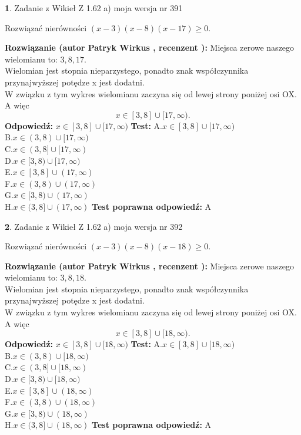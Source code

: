 \documentclass[12pt, a4paper]{article}
\theoremstyle{definition} %
\newtheorem{zad}{}
\newcommand{\zadStart}[1]{\begin{zad}#1\newline}
\newcommand{\zadStop}{\end{zad}}
\newcommand{\rozwStart}[2]{\noindent \textbf{Rozwiązanie (autor #1 , recenzent #2): }\newline}
\newcommand{\rozwStop}{\newline}
\newcommand{\odpStart}{\noindent \textbf{Odpowiedź:}\newline}
\newcommand{\odpStop}{\newline}
\newcommand{\testStart}{\noindent \textbf{Test:}\newline}
\newcommand{\testStop}{\newline}
\newcommand{\kluczStart}{\noindent \textbf{Test poprawna odpowiedź:}\newline}
\newcommand{\kluczStop}{\newline}
\begin{document}
\zadStart{Zadanie z Wikieł Z 1.62 a) moja wersja nr 391}

Rozwiązać nierówności $(x-3)(x-8)(x-17)\ge0$.
\zadStop
\rozwStart{Patryk Wirkus}{}
Miejsca zerowe naszego wielomianu to: $3, 8, 17$.\\
Wielomian jest stopnia nieparzystego, ponadto znak współczynnika przy\linebreak najwyższej potędze x jest dodatni.\\ W związku z tym wykres wielomianu zaczyna się od lewej strony poniżej osi OX. A więc $$x \in [3,8] \cup [17,\infty).$$
\rozwStop
\odpStart
$x \in [3,8] \cup [17,\infty)$
\odpStop
\testStart
A.$x \in [3,8] \cup [17,\infty)$\\
B.$x \in (3,8) \cup [17,\infty)$\\
C.$x \in (3,8] \cup [17,\infty)$\\
D.$x \in [3,8) \cup [17,\infty)$\\
E.$x \in [3,8] \cup (17,\infty)$\\
F.$x \in (3,8) \cup (17,\infty)$\\
G.$x \in [3,8) \cup (17,\infty)$\\
H.$x \in (3,8] \cup (17,\infty)$
\testStop
\kluczStart
A
\kluczStop



\zadStart{Zadanie z Wikieł Z 1.62 a) moja wersja nr 392}

Rozwiązać nierówności $(x-3)(x-8)(x-18)\ge0$.
\zadStop
\rozwStart{Patryk Wirkus}{}
Miejsca zerowe naszego wielomianu to: $3, 8, 18$.\\
Wielomian jest stopnia nieparzystego, ponadto znak współczynnika przy\linebreak najwyższej potędze x jest dodatni.\\ W związku z tym wykres wielomianu zaczyna się od lewej strony poniżej osi OX. A więc $$x \in [3,8] \cup [18,\infty).$$
\rozwStop
\odpStart
$x \in [3,8] \cup [18,\infty)$
\odpStop
\testStart
A.$x \in [3,8] \cup [18,\infty)$\\
B.$x \in (3,8) \cup [18,\infty)$\\
C.$x \in (3,8] \cup [18,\infty)$\\
D.$x \in [3,8) \cup [18,\infty)$\\
E.$x \in [3,8] \cup (18,\infty)$\\
F.$x \in (3,8) \cup (18,\infty)$\\
G.$x \in [3,8) \cup (18,\infty)$\\
H.$x \in (3,8] \cup (18,\infty)$
\testStop
\kluczStart
A
\kluczStop
\end{document}
